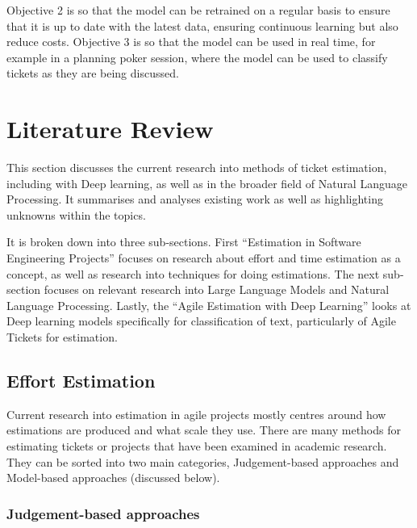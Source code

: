 \documentclass{UoYCSproject}
\begin{document}
    Objective 2 is so that the model can be retrained on a regular basis to ensure that it is up to date with the latest data, ensuring continuous learning but also reduce costs.
    Objective 3 is so that the model can be used in real time, for example in a planning poker session, where the model can be used to classify tickets as they are being discussed.


    \chapter{Literature Review}
    \label{ch:literature-review}
    This section discusses the current research into methods of ticket estimation, including with Deep learning, as well as in the broader field of Natural Language Processing.
    It summarises and analyses existing work as well as highlighting unknowns within the topics.

    It is broken down into three sub-sections.
    First “Estimation in Software Engineering Projects” focuses on research about effort and time estimation as a concept, as well as research into techniques for doing estimations.
    The next sub-section focuses on relevant research into Large Language Models and Natural Language Processing.
    Lastly, the “Agile Estimation with Deep Learning” looks at Deep learning models specifically for classification of text, particularly of Agile Tickets for estimation.


    \section{Effort Estimation}
    \label{sec:effort-estimation}
    Current research into estimation in agile projects mostly centres around how estimations are produced and what scale they use.
    There are many methods for estimating tickets or projects that have been examined in academic research.
    They can be sorted into two main categories, Judgement-based approaches and Model-based approaches (discussed below).

    \subsection{Judgement-based approaches}
    \label{subsec:judgement-based-approaches}
\end{document}
